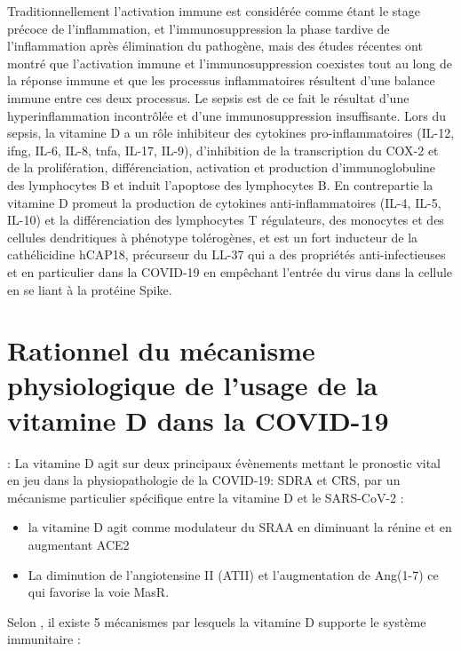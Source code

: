 \documentclass[
  a4paper,
  DIV=11,
  numbers=noendperiod,
  listof=totoc]{scrreprt}
\providecommand{\tightlist}{%
  \setlength{\itemsep}{0pt}\setlength{\parskip}{0pt}}\usepackage{longtable,booktabs,array}
\begin{document}
Traditionnellement l'activation immune est considérée comme étant le
stage précoce de l'inflammation, et l'immunosuppression la phase tardive
de l'inflammation après élimination du pathogène, mais des études
récentes ont montré que l'activation immune et l'immunosuppression
coexistes tout au long de la réponse immune et que les processus
inflammatoires résultent d'une balance immune entre ces deux processus.
Le sepsis est de ce fait le résultat d'une hyperinflammation incontrôlée
et d'une immunosuppression insuffisante. Lors du sepsis, la vitamine D a
un rôle inhibiteur des cytokines pro-inflammatoires (IL-12, \ac{ifng},
IL-6, IL-8, \ac{tnfa}, IL-17, IL-9), d'inhibition de la transcription du
COX-2 et de la prolifération, différenciation, activation et production
d'immunoglobuline des lymphocytes B et induit l'apoptose des lymphocytes
B. En contrepartie la vitamine D promeut la production de cytokines
anti-inflammatoires (IL-4, IL-5, IL-10) et la différenciation des
lymphocytes T régulateurs, des monocytes et des cellules dendritiques à
phénotype tolérogènes, et est un fort inducteur de la cathélicidine
hCAP18, précurseur du LL-37 qui a des propriétés anti-infectieuses et en
particulier dans la COVID-19 en empêchant l'entrée du virus dans la
cellule en se liant à la protéine Spike.
\autocite{Cutuli.2024,Keutmann.2022,Ødum.2023}

\section{Rationnel du mécanisme physiologique de l'usage de la vitamine
D dans la
COVID-19}\label{rationnel-du-muxe9canisme-physiologique-de-lusage-de-la-vitamine-d-dans-la-covid-19}

\textcite{Borsche.2021}: La vitamine D agit sur deux principaux
évènements mettant le pronostic vital en jeu dans la physiopathologie de
la COVID-19: \ac{SDRA} et \ac{CRS}, par un mécanisme particulier
spécifique entre la vitamine D et le SARS-CoV-2 :

\begin{itemize}
\tightlist
\item
  la vitamine D agit comme modulateur du \ac{SRAA} en diminuant la
  rénine et en augmentant ACE2
\item
  La diminution de l'angiotensine II (ATII) et l'augmentation de
  Ang(1-7) ce qui favorise la voie MasR.
\end{itemize}

Selon \textcite{Borsche.2021}, il existe 5 mécanismes par lesquels la
vitamine D supporte le système immunitaire :
\end{document}
